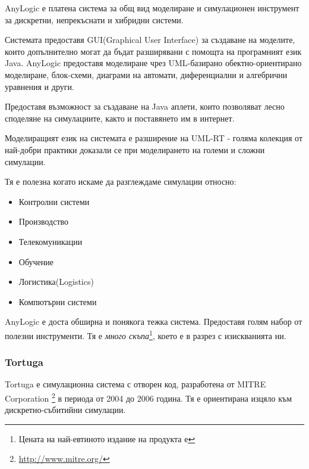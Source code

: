 			AnyLogic е платена система за общ вид моделиране и симулационен инструмент за 
			дискретни, непрекъснати и хибридни системи.
			
			
				Системата предоставя GUI(Graphical User Interface) за създаване на моделите, 
				които допълнително могат да бъдат разширявани с помощта на програмният език Java. 			
				AnyLogic предоставя моделиране чрез UML-базирано обектно-ориентирано моделиране, блок-схеми, 
				диаграми на автомати, диференциални и алгебрични уравнения и други.


				Предоставя възможност за създаване на Java аплети, които позволяват 
				лесно споделяне на симулациите, както и поставянето им в интернет.
		
		
				Моделиращият език на системата е разширение на UML-RT - голяма колекция от най-добри практики
				доказали се при моделирането на големи и сложни симулации.
		
							
				Тя е полезна когато искаме да разглеждаме симулации относно:
				
				\begin{itemize}
					\item Контролни системи
					\item Производство
					\item Телекомуникации
					\item Обучение
					\item Логистика(Logistics)
					\item Компютърни системи
				\end{itemize}			
				
				
				AnyLogic е доста обширна и понякога тежка система. Предоставя голям набор от полезни инструменти.
				Тя е \emph{много скъпа}\footnote{Цената на най-евтиното издание на продукта е }, 
				което е в разрез с изискванията ни. \cite{AnyLogic}
			
		\subsubsection{Tortuga}
		
			Tortuga е симулационна система с отворен код, разработена от MITRE Corporation
			\footnote{\url{http://www.mitre.org/}} в периода от 2004 до 2006 година.
			Тя е ориентирана изцяло към дискретно-събитийни симулации.
			

